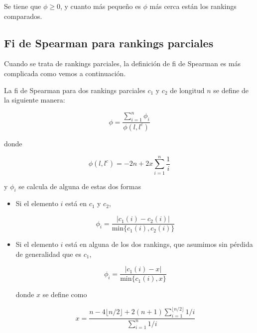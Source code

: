 Se tiene que $\phi \geq 0$, y cuanto más pequeño es $\phi$ más cerca están los rankings comparados. 

\subsection{Fi de Spearman para rankings parciales}

Cuando se trata de rankings parciales, la definición de fi de Spearman es más complicada como vemos a continuación.

\begin{defi}
La fi de Spearman para dos rankings parciales $c_1$ y $c_2$ de longitud $n$ se define de la siguiente manera:

\begin{equation}
\phi = \dfrac{\sum\limits_{i=1}^{n} \phi_i}{\phi(l, l^c)}
\end{equation} 

donde 

\begin{equation}
\phi(l, l^c) = -2n + 2x\sum\limits_{i=1}^{n} \dfrac{1}{i}
\end{equation}

y $\phi_i$ se calcula de alguna de estas dos formas

\begin{itemize}
\item Si el elemento $i$ está en $c_1$ y $c_2$,

\begin{equation}
\phi_i = \dfrac{|c_1(i) - c_2(i)|}{\mathrm{min}\{c_1(i), c_2(i)\}}
\end{equation}

\item Si el elemento $i$ está en alguna de los dos rankings, que asumimos sin pérdida de generalidad que es $c_1$,


\begin{equation}
\phi_i = \dfrac{|c_1(i) - x|}{\mathrm{min}\{c_1(i), x\}}
\end{equation} 

donde $x$ se define como

\begin{equation}
x = \dfrac{n - 4 \lfloor n/2\rfloor + 2(n+1) \sum_{i=1}^{\lfloor n/2\rfloor} 1/i}{\sum_{i=1}^{n} 1/i}
\end{equation}
\end{itemize}
\end{defi}

\begin{ejemplo}
\end{ejemplo}
